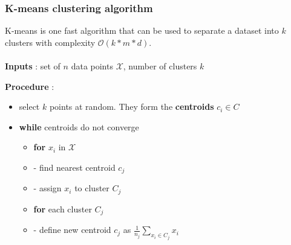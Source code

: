 \documentclass{beamer}
\begin{document}
\begin{frame}
  \frametitle{K-means clustering algorithm}
  K-means is one fast algorithm that can be used to separate a dataset into $k$
  clusters with complexity $\mathcal{O}(k*m*d)$.\\~\\

  \textbf{Inputs} : set of $n$ data points $\mathcal{X}$, number of clusters $k$

  \textbf{Procedure} :
  \begin{itemize}
    \item select $k$ points at random. They form the \textbf{centroids} $c_i \in
      C$
    \item \textbf{while} centroids do not converge
      \begin{itemize}
        \item \textbf{for} $x_i$ in $\mathcal{X}$
        \item[] - find nearest centroid $c_j$
        \item[] - assign $x_i$ to cluster $C_j$
      \end{itemize}
      \begin{itemize}
        \item \textbf{for} each cluster $C_j$
        \item[] - define new centroid $c_j$ as
                  $\frac{1}{n_j}\sum_{x_i \in C_j} x_i$
      \end{itemize}

  \end{itemize}
\end{frame}
\end{document}

